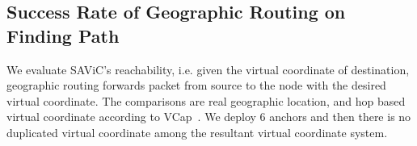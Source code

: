 \subsection{Success Rate of Geographic Routing on Finding Path}

We evaluate SAViC's reachability, i.e. given the virtual coordinate of destination, geographic routing forwards packet from source to the node with the desired virtual coordinate.
The comparisons are real geographic location, and hop based virtual coordinate according to VCap~\cite{gpsfree05infocom}. 
We deploy 6 anchors and then there is no duplicated virtual coordinate among the resultant virtual coordinate system.


